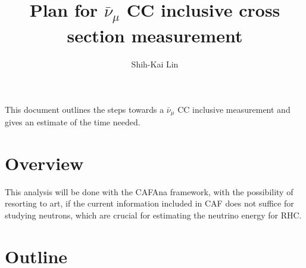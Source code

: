 \documentclass[12pt,a4paper,final]{iopart}
\begin{document}
\title[numubarcc inclusive cross section measurement]{Plan for $\bar{\nu}_\mu$ CC inclusive cross section measurement}
	
\author[cor1]{Shih-Kai Lin}
\address{Colorado State University}


%


\vspace{\baselineskip}
This document outlines the steps towards a $\bar{\nu}_\mu$ CC inclusive measurement and gives an estimate of the time needed.


\section{Overview}
This analysis will be done with the CAFAna framework, with the possibility of resorting to art, if the current information included in CAF does not suffice for studying neutrons, which are crucial for estimating the neutrino energy for RHC.

\section{Outline}
\end{document}
